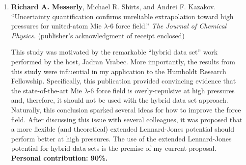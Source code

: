 \documentclass[12pt]{article}
\begin{document}
\begin{enumerate}
\item \textbf{Richard A. Messerly}, Michael R. Shirts, and Andrei F. Kazakov. ``Uncertainty quantification confirms unreliable extrapolation toward high pressures for united-atom Mie $\lambda$-6 force field.'' \textit{The Journal of Chemical Physics.} (publisher's acknowledgment of receipt enclosed)

This study was motivated by the remarkable ``hybrid data set'' work performed by the host, Jadran Vrabec. More importantly, the results from this study were influential in my application to the Humboldt Research Fellowship. Specifically, this publication provided convincing evidence that the state-of-the-art Mie $\lambda$-6 force field is overly-repulsive at high pressures and, therefore, it should not be used with the hybrid data set approach. Naturally, this conclusion sparked several ideas for how to improve the force field. After discussing this issue with several colleagues, it was proposed that a more flexible (and theoretical) extended Lennard-Jones potential should perform better at high pressures. The use of the extended Lennard-Jones potential for hybrid data sets is the premise of my current proposal. \textbf{Personal contribution: 90\%.} 



\end{enumerate}
\end{document}
